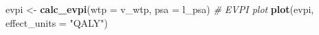 \documentclass[
]{article}
\newenvironment{Shaded}{\begin{snugshade}}{\end{snugshade}}
\newcommand{\CommentTok}[1]{\textcolor[rgb]{0.56,0.35,0.01}{\textit{#1}}}
\newcommand{\DataTypeTok}[1]{\textcolor[rgb]{0.13,0.29,0.53}{#1}}
\newcommand{\KeywordTok}[1]{\textcolor[rgb]{0.13,0.29,0.53}{\textbf{#1}}}
\newcommand{\NormalTok}[1]{#1}
\newcommand{\StringTok}[1]{\textcolor[rgb]{0.31,0.60,0.02}{#1}}
\begin{document}
\begin{Shaded}
\begin{Highlighting}[]
\NormalTok{evpi <-}\StringTok{ }\KeywordTok{calc_evpi}\NormalTok{(}\DataTypeTok{wtp =}\NormalTok{ v_wtp, }\DataTypeTok{psa =}\NormalTok{ l_psa)}
\CommentTok{# EVPI plot}
\KeywordTok{plot}\NormalTok{(evpi, }\DataTypeTok{effect_units =} \StringTok{"QALY"}\NormalTok{)}
\end{Highlighting}
\end{Shaded}
\end{document}
